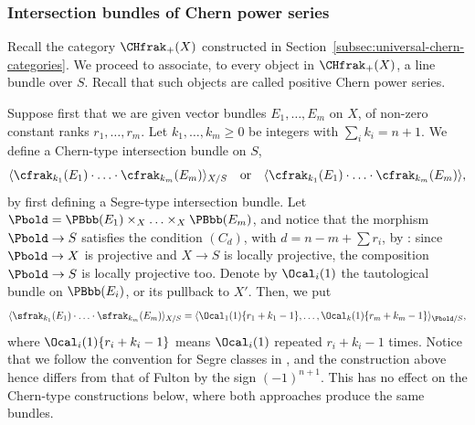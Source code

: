 \subsubsection{Intersection bundles of Chern power series}
Recall the category $\CHfrak_{+}(X)$ constructed in Section~\ref{subsec:universal-chern-categories}. We proceed to associate, to every object in $\CHfrak_{+}(X)$, a line bundle over $S$. Recall that such objects are called positive Chern power series.

Suppose first that we are given vector bundles $E_1, \ldots, E_m$ on $X$, of non-zero constant ranks $r_1, \ldots, r_m$. Let $k_{1},\ldots,k_{m}\geq 0$ be integers with $\sum_{i}k_{i}=n+1$. We define a Chern-type intersection bundle on $S$,
\begin{equation}\label{eq:general-Chern-bundle-1}
\langle \cfrak_{k_{1}}(E_{1})\cdot\ldots \cdot \cfrak_{k_{m}}(E_{m})\rangle_{X/S}\quad\text{or}\quad \langle \cfrak_{k_{1}}(E_{1})\cdot\ldots \cdot \cfrak_{k_{m}}(E_{m})\rangle,
\end{equation}
by first defining a Segre-type intersection bundle. Let $\Pbold=\PBbb(E_{1})\times_{X}\ldots\times_{X}\PBbb(E_{m})$, and notice that the morphism $\Pbold\to S$ satisfies the condition $(C_{d})$, with $d=n-m+\sum r_{i}$, by \cite[\href{https://stacks.math.columbia.edu/tag/0C4P}{0C4P}]{stacks-project}: since $\Pbold\to X$ is projective and $X\to S$ is locally projective, the composition $\Pbold\to S$ is locally projective too. Denote by $\Ocal_i (1)$ the tautological bundle on $\PBbb (E_{i})$, or its pullback to $X'$. Then, we put\vspace*{-3pt}
\begin{equation}\label{eq:definition-Segre-classes}
\langle \sfrak_{k_1}(E_1)\cdot \ldots\cdot \sfrak_{k_{m}}(E_m) \rangle_{X/S} = \langle \Ocal_1 (1)\{r_1+k_1-1\}, \ldots, \Ocal_k (1)\{r_m+k_{m}-1\} \rangle_{\Pbold/S},
\end{equation}
where $\Ocal_i (1)\{r_i+k_i-1\}$ means $\Ocal_{i}(1)$ repeated $r_{i}+k_{i}-1$ times. Notice that we follow the convention for Segre classes in \cite{Elkikfib}, and the construction above hence differs from that of Fulton \cite{Fulton} by the sign $(-1)^{n+1}$. This has no effect on the Chern-type constructions below, where both approaches produce the same bundles.

